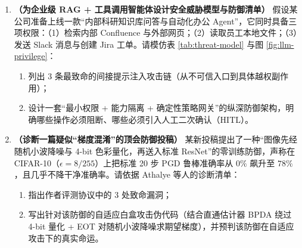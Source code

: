 \begin{enumerate}[label=\textbf{7.3.\arabic*}, start=7]
  \item \textbf{（为企业级 RAG + 工具调用智能体设计安全威胁模型与防御清单）} 假设某公司准备上线一款“内部科研知识库问答与自动化办公 Agent”，它同时具备三项权限：（1）检索内部 Confluence 与外部网页；（2）读取员工本地文件；（3）发送 Slack 消息与创建 Jira 工单。请模仿表 \ref{tab:threat-model} 与图 \ref{fig:llm-privilege}：
  \begin{enumerate}
    \item 列出 3 条最致命的间接提示注入攻击链（从不可信入口到具体越权副作用）；
    \item 设计一套“最小权限 + 能力隔离 + 确定性策略网关”的纵深防御架构，明确哪些操作必须阻断、哪些必须引入人工二次确认（HITL）。
  \end{enumerate}

  \item \textbf{（诊断一篇疑似“梯度混淆”的顶会防御投稿）} 某新投稿提出了一种“图像先经随机小波降噪与 4-bit 色彩量化，再送入标准 ResNet”的零训练防御，声称在 CIFAR-10（$\epsilon = 8/255$）上把标准 20 步 PGD 鲁棒准确率从 $0\%$ 飙升至 $78\%$，且几乎不降干净准确率。请依据 Athalye 等人的诊断清单：
  \begin{enumerate}
    \item 指出作者评测协议中的 3 处致命漏洞；
    \item 写出针对该防御的自适应白盒攻击伪代码（结合直通估计器 BPDA 绕过 4-bit 量化 + EOT 对随机小波降噪求期望梯度），并预判该防御在自适应攻击下的真实命运。
  \end{enumerate}
\end{enumerate}
